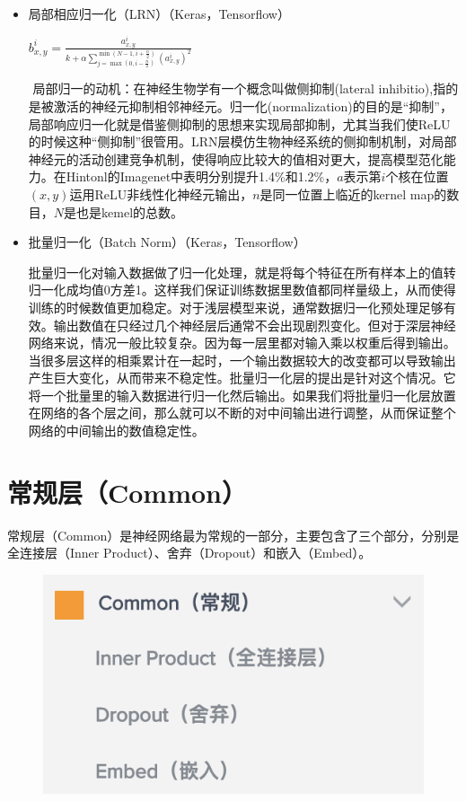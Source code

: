 \documentclass{progbookcn}
\begin{document}
\begin{itemize}

\item 局部相应归一化（LRN）（Keras，Tensorflow）

  ​					$b^i_{x,y}=\frac{a^i_{x,y}}{k+\alpha \sum_{j=\max(0,i-\frac{n}{2})}^{{\min(N-1,i+\frac{n}{2})}}(a^i_{x,y})^2}$

  ​	局部归一的动机：在神经生物学有一个概念叫做侧抑制(lateral inhibitio),指的是被激活的神经元抑制相邻神经元。归一化(normalization)的目的是“抑制”，局部响应归一化就是借鉴侧抑制的思想来实现局部抑制，尤其当我们使ReLU的时候这种“侧抑制”很管用。LRN层模仿生物神经系统的侧抑制机制，对局部神经元的活动创建竞争机制，使得响应比较大的值相对更大，提高模型范化能力。在Hintonl的Imagenet中表明分别提升1.4\%和1.2\%，$a$表示第$i$个核在位置$(x,y)$运用ReLU非线性化神经元输出，$n$是同一位置上临近的kernel map的数目，$N$是也是kemel的总数。

\item 批量归一化（Batch Norm）（Keras，Tensorflow）

  ​	批量归一化对输入数据做了归一化处理，就是将每个特征在所有样本上的值转归一化成均值0方差1。这样我们保证训练数据里数值都同样量级上，从而使得训练的时候数值更加稳定。对于浅层模型来说，通常数据归一化预处理足够有效。输出数值在只经过几个神经层后通常不会出现剧烈变化。但对于深层神经网络来说，情况一般比较复杂。因为每一层里都对输入乘以权重后得到输出。当很多层这样的相乘累计在一起时，一个输出数据较大的改变都可以导致输出产生巨大变化，从而带来不稳定性。批量归一化层的提出是针对这个情况。它将一个批量里的输入数据进行归一化然后输出。如果我们将批量归一化层放置在网络的各个层之间，那么就可以不断的对中间输出进行调整，从而保证整个网络的中间输出的数值稳定性。

\end{itemize}


\section{ 常规层（Common）}

常规层（Common）是神经网络最为常规的一部分，主要包含了三个部分，分别是全连接层（Inner Product）、舍弃（Dropout）和嵌入（Embed）。
\begin{figure}[H]
  \centering
  \includegraphics[scale = 0.6]{Common_layer.png}
\end{figure}
\end{document}
